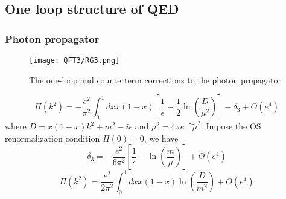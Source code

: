\documentclass[cyan]{elegantnote}
\begin{document}
\subsection{One loop structure of QED}
\subsubsection{Photon propagator}
\begin{figure}[!h]
\centering
\texttt{[image: QFT3/RG3.png]}
\caption{The one-loop and counterterm corrections to the photon propagator}
\end{figure}
\[\Pi(k^2) = -\frac{e^2}{\pi^2} \int_0^1 dx x(1-x) \left[ \frac{1}{\epsilon} - \frac{1}{2}\ln(\frac{D}{\mu^2})\right] - \delta_3 + O(e^4)\]
where $D = x(1-x)k^2+m^2-i\epsilon$ and $\mu^2 = 4\pi e^{-\gamma} \tilde{\mu}^2$.
Impose the OS renormalization condition $\Pi(0) = 0$, we have
\[\delta_3 = -\frac{e^2}{6\pi^2} \left[ \frac{1}{\epsilon} - \ln(\frac{m}{\mu})\right] + O(e^4)\]
\[\Pi(k^2) = \frac{e^2}{2\pi^2} \int_0^1 dx x(1-x) \ln(\frac{D}{m^2}) + O(e^4)\]
\end{document}
